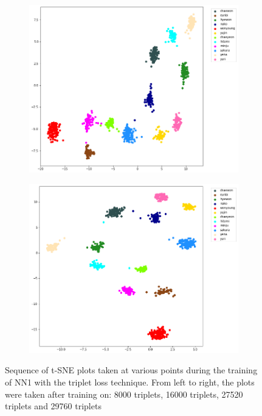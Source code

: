 \begin{enumerate}[left=0pt]
\begin{figure}[htbp]
\begin{subfigure}{0.24\textwidth}
        \includegraphics[trim=35 20 100 0, clip, width=\textwidth]{images/faceReco/nn1-and-triplet/tsne-3.png}     
    \end{subfigure}
    \hfill
    \begin{subfigure}{0.24\textwidth}
        \includegraphics[trim=32 22 100 0, clip, width=\textwidth]{images/faceReco/nn1-and-triplet/tsne-4.png}     
    \end{subfigure}

    \caption{Sequence of t-SNE plots taken at various points during the training of NN1 with the triplet loss technique. From left to right, the plots were taken after training on: 8000 triplets, 16000 triplets, 27520 triplets and 29760 triplets}
    \label{Figure:Face-Recognition:Results:nn1-and-triplet-loss-tsne-sequence}
\end{figure}


\end{enumerate}
